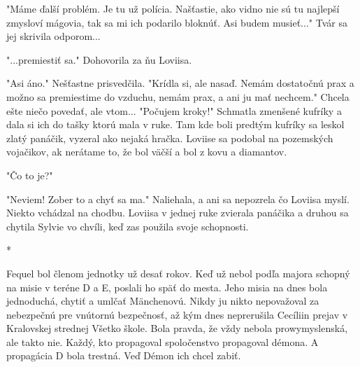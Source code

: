 \documentclass{book}
\begin{document}
"$ $Máme ďalší problém. Je tu už polícia. Našťastie, ako vidno nie sú tu najlepší zmysloví mágovia, tak sa mi ich podarilo bloknúť. Asi budem musieť..."$ $  Tvár sa jej skrivila odporom...

"$ $...premiestiť sa."$ $  Dohovorila za ňu Loviisa.

"$ $Asi áno."$ $  Nešťastne prisvedčila. "$ $Krídla si, ale nasaď. Nemám dostatočnú prax a možno sa premiestime do vzduchu, nemám prax, a ani ju mať nechcem."$ $  Chcela ešte niečo povedať, ale vtom... "$ $Počujem kroky!"$ $  Schmatla zmenšené kufríky a dala si ich do tašky ktorú mala v ruke. Tam kde boli predtým kufríky sa leskol zlatý panáčik, vyzeral ako nejaká hračka. Loviise sa podobal na pozemských vojačikov, ak nerátame to, že bol väčší a bol z kovu a diamantov.

"$ $Čo to je?"$ $ 

"$ $Neviem! Zober to a chyť sa ma."$ $  Naliehala, a ani sa nepozrela čo Loviisa myslí. Niekto vchádzal na chodbu. Loviisa v jednej ruke zvierala panáčika a druhou sa chytila Sylvie vo chvíli, keď zas použila svoje schopnosti.

\begin{center}

*

\end{center}

Fequel bol členom jednotky už desať rokov. Keď už nebol podľa majora schopný na misie v teréne D a E, poslali ho späť do mesta. Jeho misia na dnes bola jednoduchá, chytiť a umlčať Mänchenovú. Nikdy ju nikto nepovažoval za nebezpečnú pre vnútornú bezpečnosť, až kým dnes neprerušila Cecíliin prejav v Kralovskej strednej Všetko škole. Bola pravda, že vždy nebola prowymyslenská, ale takto nie. Každý, kto propagoval spoločenstvo propagoval démona. A propagácia D bola trestná. Veď Démon ich chcel zabiť.
\end{document}
